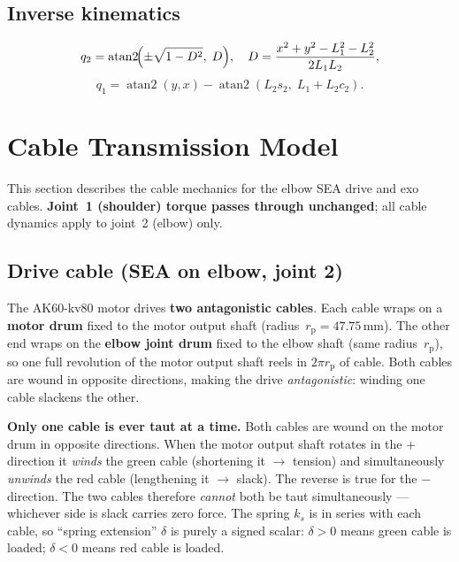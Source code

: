 \documentclass[11pt,a4paper]{article}
\newcommand{\rp}{r_{\mathrm{p}}}
\begin{document}
\subsection{Inverse kinematics}

\begin{equation}
  q_2 = \operatorname{atan2}\!\Bigl(\pm\sqrt{1-D^2},\;D\Bigr),\quad
  D = \frac{x^2+y^2-L_1^2-L_2^2}{2L_1 L_2},
  \label{eq:ik}
\end{equation}
\begin{equation}
  q_1 = \operatorname{atan2}(y,x) - \operatorname{atan2}(L_2 s_2,\;L_1+L_2 c_2).
\end{equation}

\section{Cable Transmission Model}
\label{sec:cable}

This section describes the cable mechanics for the elbow SEA drive and exo cables.
\textbf{Joint~1 (shoulder) torque passes through unchanged}; all cable
dynamics apply to joint~2 (elbow) only.

\subsection{Drive cable (SEA on elbow, joint 2)}
\label{sec:sea_model}

The AK60-kv80 motor drives \textbf{two antagonistic cables}.  Each cable
wraps on a \textbf{motor drum} fixed to the motor output shaft
(radius~$\rp = 47.75$\,mm).  The other end wraps on the
\textbf{elbow joint drum} fixed to the elbow shaft (same radius~$\rp$),
so one full revolution of the motor output shaft reels in $2\pi\rp$ of
cable.  Both cables are wound in opposite directions, making the drive
\emph{antagonistic}: winding one cable slackens the other.

\begin{warnbox}
\textbf{Only one cable is ever taut at a time.}
Both cables are wound on the motor drum in opposite directions.  When the
motor output shaft rotates in the $+$ direction it \emph{winds} the green
cable (shortening
it $\to$ tension) and simultaneously \emph{unwinds} the red cable
(lengthening it $\to$ slack).  The reverse is true for the $-$ direction.
The two cables therefore \emph{cannot} both be taut simultaneously ---
whichever side is slack carries zero force.  The spring $k_s$ is in series
with each cable, so ``spring extension'' $\delta$ is purely a signed scalar:
$\delta > 0$ means green cable is loaded; $\delta < 0$ means red cable is
loaded.
\end{warnbox}
\end{document}
